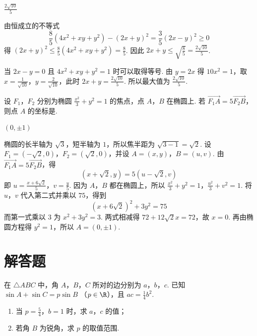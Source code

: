 \begin{answer}
\(\frac{2\sqrt{10}}{5}\)
\end{answer}

\begin{solution}
由恒成立的不等式
\[
\frac{8}{5}(4x^2+xy+y^2)-(2x+y)^2=\frac{3}{5}(2x-y)^2\geqslant 0
\]
得 \((2x+y)^2\leqslant\frac{8}{5}(4x^2+xy+y^2)=\frac{8}{5}\). 因此 \(2x+y\leqslant\sqrt{\frac{8}{5}}=\frac{2\sqrt{10}}{5}\).

当 \(2x-y=0\) 且 \(4x^2+xy+y^2=1\) 时可以取得等号. 由 \(y=2x\) 得 \(10x^2=1\)，取 \(x=\frac{1}{\sqrt{10}}\)，\(y=\frac{2}{\sqrt{10}}\)，此时 \(2x+y=\frac{2\sqrt{10}}{5}\). 所以最大值为 \(\frac{2\sqrt{10}}{5}\).
\end{solution}

\begin{problem}
设 \(F_{1}\)，\(F_{2}\) 分别为椭圆 \(\frac{x^{2}}{3} + y^{2} = 1\) 的焦点，点 \(A\)，\(B\) 在椭圆上. 若 \(\overrightarrow{F_{1}A} = 5\overrightarrow{F_{2}B}\)，则点 \(A\) 的坐标是\fillinblank{}.
\end{problem}

\begin{answer}
\((0,\pm 1)\)
\end{answer}

\begin{solution}
椭圆的长半轴为 \(\sqrt{3}\)，短半轴为 \(1\)，所以焦半距为 \(\sqrt{3-1}=\sqrt{2}\). 设 \(F_1=(-\sqrt{2},0)\)，\(F_2=(\sqrt{2},0)\)，并设 \(A=(x,y)\)，\(B=(u,v)\). 由
\(\overrightarrow{F_1A}=5\overrightarrow{F_2B}\)，得
\[
(x+\sqrt{2},y)=5(u-\sqrt{2},v)
\]
即 \(u=\frac{x+6\sqrt{2}}{5}\)，\(v=\frac{y}{5}\). 因为 \(A\)，\(B\) 都在椭圆上，所以
\(\frac{x^2}{3}+y^2=1\)，\(\frac{u^2}{3}+v^2=1\).
将 \(u\)，\(v\) 代入第二式并乘以 \(75\)，得到
\[
(x+6\sqrt{2})^2+3y^2=75
\]
而第一式乘以 \(3\) 为 \(x^2+3y^2=3\). 两式相减得 \(72+12\sqrt{2}x=72\)，故 \(x=0\). 再由椭圆方程得 \(y^2=1\)，所以 \(A=(0,\pm1)\).
\end{solution}

\section{解答题}

\begin{problem}
在 \(\triangle ABC\) 中，角 \(A\)，\(B\)，\(C\) 所对的边分别为 \(a\)，\(b\)，\(c\). 已知 \(\sin A + \sin C = p \sin B\) （\(p \in \R\)），且 \(ac = \frac{1}{4} b^2\).
\begin{enumerate}
\item 当 \(p = \frac{5}{4}\)，\(b = 1\) 时，求 \(a\)，\(c\) 的值；
\item 若角 \(B\) 为锐角，求 \(p\) 的取值范围.
\end{enumerate}
\end{problem}

